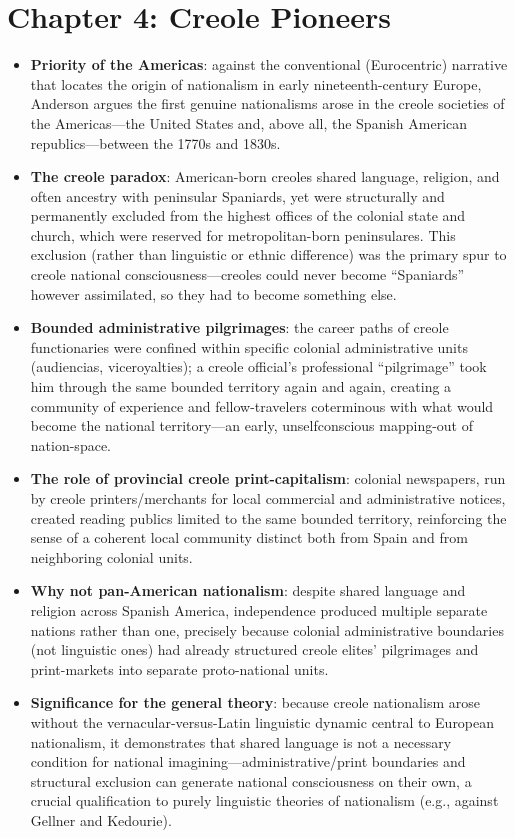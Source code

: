 \documentclass[12pt]{article}
\begin{document}
\section{Chapter 4: Creole Pioneers}

\begin{itemize}[leftmargin=*, itemsep=4pt]
    \item \textbf{Priority of the Americas}: against the conventional (Eurocentric) narrative that locates the origin of nationalism in early nineteenth-century Europe, Anderson argues the first genuine nationalisms arose in the creole societies of the Americas---the United States and, above all, the Spanish American republics---between the 1770s and 1830s.
    \item \textbf{The creole paradox}: American-born creoles shared language, religion, and often ancestry with peninsular Spaniards, yet were structurally and permanently excluded from the highest offices of the colonial state and church, which were reserved for metropolitan-born peninsulares. This exclusion (rather than linguistic or ethnic difference) was the primary spur to creole national consciousness---creoles could never become ``Spaniards'' however assimilated, so they had to become something else.
    \item \textbf{Bounded administrative pilgrimages}: the career paths of creole functionaries were confined within specific colonial administrative units (audiencias, viceroyalties); a creole official's professional ``pilgrimage'' took him through the same bounded territory again and again, creating a community of experience and fellow-travelers coterminous with what would become the national territory---an early, unselfconscious mapping-out of nation-space.
    \item \textbf{The role of provincial creole print-capitalism}: colonial newspapers, run by creole printers/merchants for local commercial and administrative notices, created reading publics limited to the same bounded territory, reinforcing the sense of a coherent local community distinct both from Spain and from neighboring colonial units.
    \item \textbf{Why not pan-American nationalism}: despite shared language and religion across Spanish America, independence produced multiple separate nations rather than one, precisely because colonial administrative boundaries (not linguistic ones) had already structured creole elites' pilgrimages and print-markets into separate proto-national units.
    \item \textbf{Significance for the general theory}: because creole nationalism arose without the vernacular-versus-Latin linguistic dynamic central to European nationalism, it demonstrates that shared language is not a necessary condition for national imagining---administrative/print boundaries and structural exclusion can generate national consciousness on their own, a crucial qualification to purely linguistic theories of nationalism (e.g., against Gellner and Kedourie).
\end{itemize}
\end{document}
